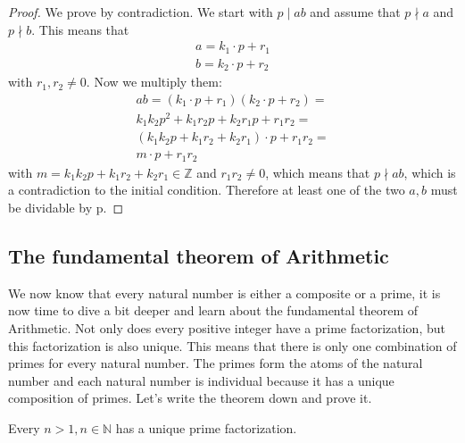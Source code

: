\documentclass{article}
\theoremstyle{definition}
\begin{document}
\begin{proof}
   We prove by contradiction. We start with $p\mid ab$ and assume that $p \nmid a$ and $p \nmid b$. This means that
   \begin{align}
    a = k_1\cdot p + r_1 \\
    b = k_2\cdot p + r_2
   \end{align}
   with $r_1,r_2 \neq 0$. Now we multiply them:
   \begin{align}
       ab = (k_1\cdot p + r_1)(k_2\cdot p + r_2) = \\
       k_1 k_2 p^2 + k_1 r_2 p + k_2 r_1 p + r_1 r_2 =\\ 
       (k_1 k_2 p + k_1 r_2 + k_2 r_1)\cdot p + r_1 r_2 = \\
       m \cdot p + r_1r_2
   \end{align}
   with $m = k_1 k_2 p + k_1 r_2 + k_2 r_1 \in \mathbb{Z} $ and  $r_1r_2 \neq 0$, which means that $p \nmid ab$, which is a contradiction to the initial condition. Therefore at least one of the two $a,b$ must be dividable by p.
\end{proof}

\subsection{The fundamental theorem of Arithmetic}
We now know that every natural number is either a composite or a prime, it is now time to dive a bit deeper and learn about the fundamental theorem of Arithmetic. Not only does every positive integer have a prime factorization, but this factorization is also unique. This means that there is only one combination of primes for every natural number. The primes form the atoms of the natural number and each natural number is individual because it has a unique composition of primes. Let's write the theorem down and prove it.

\begin{theorem}
    Every $n>1, n \in \mathbb{N}$ has a unique prime factorization.
\end{theorem}
\end{document}
